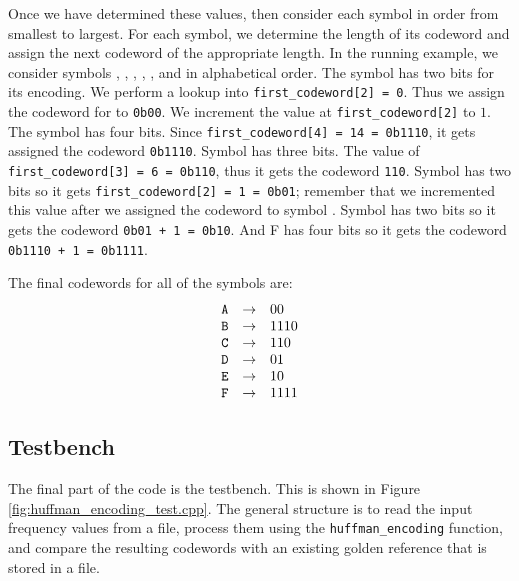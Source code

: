 Once we have determined these values, then consider each symbol in order from smallest to largest. For each symbol, we determine the length of its codeword and assign the next codeword of the appropriate length.  In the running example, we consider symbols , , , , , and  in alphabetical order. The symbol  has two bits for its encoding. We perform a lookup into \lstinline{first_codeword[2] = 0}. Thus we assign the codeword for  to \lstinline{0b00}. We increment the value at \lstinline{first_codeword[2]} to $1$. The symbol  has four bits. Since \lstinline{first_codeword[4] = 14 = 0b1110}, it gets assigned the codeword \lstinline{0b1110}. Symbol  has three bits. The value of \lstinline{first_codeword[3] = 6 = 0b110}, thus it gets the codeword \lstinline{110}. Symbol  has two bits so it gets \lstinline{first_codeword[2] = 1 = 0b01}; remember that we incremented this value after we assigned the codeword to symbol . Symbol  has two bits so it gets the codeword \lstinline{0b01 + 1 = 0b10}. And F has four bits so it gets the codeword \lstinline{0b1110 + 1 = 0b1111}.

The final codewords for all of the symbols are:
\begin{equation}
\begin{array} {lll} 
\texttt{A} & \rightarrow & 00 \\
\texttt{B} & \rightarrow & 1110\\
\texttt{C} & \rightarrow  & 110 \\
\texttt{D} & \rightarrow & 01 \\
\texttt{E} & \rightarrow & 10\\
\texttt{F} & \rightarrow & 1111\\
\end{array}
\label{eq:codewords}
\end{equation}

\subsection{Testbench}
\label{sec:huffman_testbench}

The final part of the code is the testbench. This is shown in Figure \ref{fig:huffman_encoding_test.cpp}. The general structure is to read the input frequency values from a file, process them using the \lstinline{huffman_encoding} function, and compare the resulting codewords with an existing golden reference that is stored in a file. 

